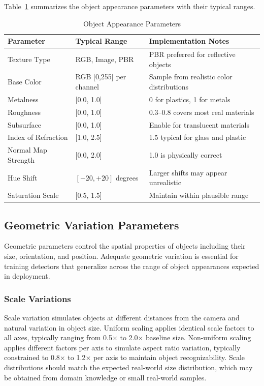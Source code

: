 Table~\ref{tab:appearance_params} summarizes the object appearance parameters with their typical ranges.

\begin{table}[htbp]
\centering
\caption{Object Appearance Parameters}
\label{tab:appearance_params}
\begin{tabular}{p{3.5cm}p{3cm}p{5cm}}
\hline
\textbf{Parameter} & \textbf{Typical Range} & \textbf{Implementation Notes} \\
\hline
Texture Type & RGB, Image, PBR & PBR preferred for reflective objects \\
Base Color & RGB [0,255] per channel & Sample from realistic color distributions \\
Metalness & [0.0, 1.0] & 0 for plastics, 1 for metals \\
Roughness & [0.0, 1.0] & 0.3--0.8 covers most real materials \\
Subsurface & [0.0, 1.0] & Enable for translucent materials \\
Index of Refraction & [1.0, 2.5] & 1.5 typical for glass and plastic \\
Normal Map Strength & [0.0, 2.0] & 1.0 is physically correct \\
Hue Shift & $[-20, +20]$ degrees & Larger shifts may appear unrealistic \\
Saturation Scale & [0.5, 1.5] & Maintain within plausible range \\
\hline
\end{tabular}
\end{table}

\subsection{Geometric Variation Parameters}

Geometric parameters control the spatial properties of objects including their size, orientation, and position. Adequate geometric variation is essential for training detectors that generalize across the range of object appearances expected in deployment.

\subsubsection{Scale Variations}

Scale variation simulates objects at different distances from the camera and natural variation in object size. Uniform scaling applies identical scale factors to all axes, typically ranging from 0.5$\times$ to 2.0$\times$ baseline size. Non-uniform scaling applies different factors per axis to simulate aspect ratio variation, typically constrained to 0.8$\times$ to 1.2$\times$ per axis to maintain object recognizability. Scale distributions should match the expected real-world size distribution, which may be obtained from domain knowledge or small real-world samples.

